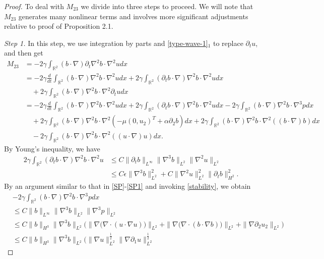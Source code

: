 \documentclass[reqno,11pt]{amsart}
\def\R{\mathbb R}
\numberwithin{Thm}{section}
\begin{document}
\begin{proof}
To deal with  $M_{23}$ we divide into three steps to proceed. We will note that  $M_{23}$ generates many nonlinear terms and involves more significant adjustments relative to proof of Proposition 2.1.

 {\it {Step 1.}} In this step, we  use integration by parts and \eqref{type-wave-1}$_1$ to replace $\partial_tu$, and then get
\begin{align}\label{K}
M_{23}&=-2\gamma\int_{\R^2}(b\cdot\nabla)\partial_t\nabla^2 b\cdot\nabla^2 udx\nonumber\\
&=-2\gamma\frac{d}{dt}\int_{\R^2}(b\cdot\nabla)\nabla^2 b\cdot\nabla^2 udx+2\gamma\int_{\R^2}(\partial_t b\cdot\nabla)\nabla^2 b\cdot\nabla^2 udx\nonumber\\
&\quad+2\gamma\int_{\R^2}( b\cdot\nabla)\nabla^2 b\cdot\nabla^2\partial_t udx\nonumber\\
&=-2\gamma\frac{d}{dt}\int_{\R^2}(b\cdot\nabla)\nabla^2 b\cdot\nabla^2 udx+2\gamma\int_{\R^2}(\partial_t b\cdot\nabla)\nabla^2 b\cdot\nabla^2 udx-2\gamma\int_{\R^2}(b\cdot\nabla)\nabla^2 b\cdot\nabla^3pdx
\nonumber\\
&\quad+2\gamma\int_{\R^2}(b\cdot\nabla)\nabla^2 b\cdot\nabla^2(-\mu (0,u_2)^{T} +\alpha\partial_2 b)dx+2\gamma\int_{\R^2}(b\cdot\nabla)\nabla^2 b\cdot\nabla^2( (b \cdot \nabla) b)dx
\nonumber\\
&\quad-2\gamma\int_{\R^2}(b\cdot\nabla)\nabla^2 b\cdot\nabla^2( (u \cdot \nabla) u)dx.
\end{align}
By Young's inequality, we have
\begin{align}\label{K-1-1}
2\gamma\int_{\R^2}(\partial_tb\cdot\nabla)\nabla^2 b\cdot \nabla^2 u&\leq
C\|\partial_t b\|_{L^{\infty}}\|\nabla^3 b\|_{L^2}\|\nabla^2 u\|_{L^2}\nonumber\\
&\leq C\epsilon\|\nabla^3b\|_{L^2}^2+C\|\nabla^2 u\|_{L^2}^2\|\partial_tb\|_{H^2}^2.
\end{align}
By an argument similar to that in \eqref{SP}-\eqref{SP1} and invoking \eqref{stability}, we obtain
\begin{align*}
&-2\gamma\int_{\R^2}(b\cdot\nabla)\nabla^2 b\cdot\nabla^3 pdx
\nonumber\\&\leq
C\|b\|_{L^\infty}\|\nabla^3 b\|_{L^2}\|\nabla^3 p\|_{L^2}\nonumber\\
&\leq C\|b\|_{H^3}\|\nabla^3 b\|_{L^2}\big(\|\nabla\big(\nabla\cdot(u\cdot\nabla u)\big)\|_{L^2}+\|\nabla\big(\nabla\cdot(b\cdot\nabla b)\big)\|_{L^2}+\|\nabla\partial_2u_2\|_{L^2}\big)\nonumber\\
&\leq C\|b\|_{H^3}\|\nabla^3 b\|_{L^2}\Big(\|\nabla u\|_{L^{2}}^{\frac{1}{2}}\|\nabla\partial_{1} u\|_{L^{2}}^{\frac{1}{2}}

\end{align*}
\end{proof}
\end{document}
